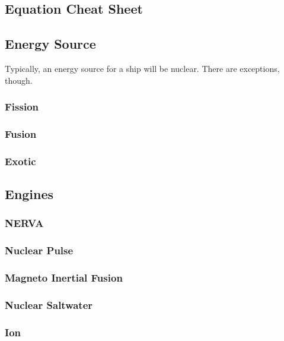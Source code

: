 
\subsection{Equation Cheat Sheet}

\subsection{Energy Source}
\par
Typically, an energy source for a ship will be nuclear. There are exceptions, though.

\subsubsection{Fission}

\subsubsection{Fusion}

\subsubsection{Exotic}

\subsection{Engines}

\subsubsection{NERVA}

\subsubsection{Nuclear Pulse}

\subsubsection{Magneto Inertial Fusion}

\subsubsection{Nuclear Saltwater}

\subsubsection{Ion}

